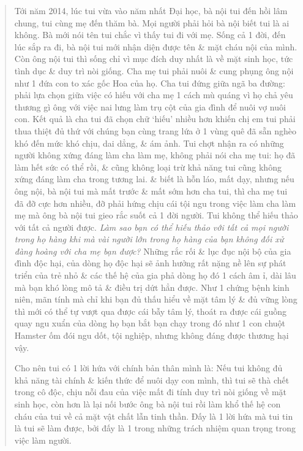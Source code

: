 \documentclass[12pt,twoside]{book}
\begin{document}
\begin{quote}
	Tới năm 2014, lúc tui vừa vào năm nhất Đại học, bà nội tui đến hồi lâm chung, tui cùng mẹ đến thăm bà. Mọi người phải hỏi bà nội biết tui là ai không. Bà mới nói tên tui chắc vì thấy tui đi với mẹ. Sống cả 1 đời, đến lúc sắp ra đi, bà nội tui mới nhận diện được tên \& mặt cháu nội của mình. Còn ông nội tui thì sống chỉ vì mục đích duy nhất là về mặt sinh học, tức tình dục \& duy trì nòi giống. Cha mẹ tui phải nuôi \& cung phụng ông nội như 1 đứa con to xác gốc Hoa của họ. Cha tui đứng giữa ngã ba đường: phải lựa chọn giữa việc có hiếu với cha mẹ 1 cách mù quáng vì họ chả yêu thương gì ông với việc nai lưng làm trụ cột của gia đình để nuôi vợ nuôi con. Kết quả là cha tui đã chọn chữ `hiếu' nhiều hơn khiến chị em tui phải thua thiệt đủ thứ với chúng bạn cùng trang lứa ở 1 vùng quê đã sẵn nghèo khó đến mức khó chịu, dai dẳng, \& ám ảnh. Tui chợt nhận ra có những người không xứng đáng làm cha làm mẹ, không phải nói cha mẹ tui: họ đã làm hết sức có thể rồi, \& cũng không loại trừ khả năng tui cũng không xứng đáng làm cha trong tương lai. \& biết là hỗn láo, mất dạy, nhưng nếu ông nội, bà nội tui mà mất trước \& mất sớm hơn cha tui, thì cha mẹ tui đã đỡ cực hơn nhiều, đỡ phải hứng chịu cái tội ngu trong việc làm cha làm mẹ mà ông bà nội tui gieo rắc suốt cả 1 đời người. Tui không thể hiếu thảo với tất cả người được. {\it Làm sao bạn có thể hiếu thảo với tất cả mọi người trong họ hàng khi mà vài người lớn trong họ hàng của bạn không đối xử đàng hoàng với cha mẹ bạn được?} Những rắc rối \& lục đục nội bộ của gia đình độc hại, của dòng họ độc hại sẽ ảnh hưởng rất nặng nề lên sự phát triển của trẻ nhỏ \& các thế hệ của gia phả dòng họ đó 1 cách âm ỉ, dài lâu mà bạn khó lòng mô tả \& điều trị dứt hẳn được. Như 1 chứng bệnh kinh niên, mãn tính mà chỉ khi bạn đủ thấu hiểu về mặt tâm lý \& đủ vững lòng thì mới có thể tự vượt qua được cái bẫy tâm lý, thoát ra được cái guồng quay ngu xuẩn của dòng họ bạn bắt bạn chạy trong đó như 1 con chuột Hamster ốm đói ngu dốt, tội nghiệp, nhưng không đáng được thương hại vậy.
	
	Cho nên tui có 1 lời hứa với chính bản thân mình là: Nếu tui không đủ khả năng tài chính \& kiến thức để nuôi dạy con mình, thì tui sẽ thà chết trong cô độc, chịu nỗi đau của việc mất đi tính duy trì nòi giống về mặt sinh học, còn hơn là lại nối bước ông bà nội tui rồi làm khổ thế hệ con cháu của tui về cả mặt vật chất lẫn tinh thần. Đấy là 1 lời hứa mà tui tin là tui sẽ làm được, bởi đấy là 1 trong những trách nhiệm quan trọng trong việc làm người.
\end{quote}
\end{document}
